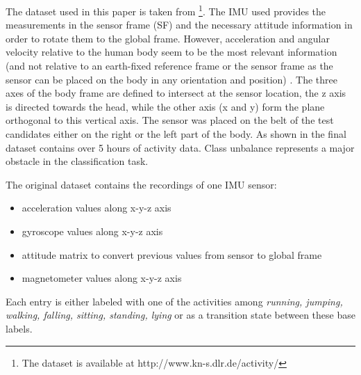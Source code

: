 The dataset used in this paper is taken from \cite{base-paper} \footnote{The dataset is available at http://www.kn-s.dlr.de/activity/}. The IMU used provides the measurements in the sensor frame (SF) and the necessary attitude information in order to rotate them to the global frame. However, acceleration and angular velocity relative to the human body seem to be the most relevant information (and not relative to an earth-fixed reference frame or the sensor frame as the sensor can be placed on the body in any orientation and position) \cite{base-paper}.
The three axes of the body frame are defined to intersect at the sensor location, the z axis is directed towards the head, while the other axis (x and y) form the plane orthogonal to this vertical axis. The sensor was placed on the belt of the test candidates either on the right or the left part of the body.
As shown in  the final dataset contains over 5 hours of activity data. Class unbalance represents a major obstacle in the classification task. \\

\begin{table}[!htbp]
\captionsetup{font=scriptsize, justification=centering}
\centering
{}
\caption{Total activity data times for each recorded activity.}
\label{activity_times_table}
\end{table}

The original dataset contains the recordings of one IMU sensor:
\begin{itemize}
\item acceleration values along x-y-z axis
\item gyroscope values along x-y-z axis
\item attitude matrix to convert previous values from sensor to global frame
\item magnetometer values along x-y-z axis
\end{itemize}
Each entry is either labeled with one of the activities among {\it running, jumping, walking, falling, sitting, standing, lying} or as a transition state between these base labels.

